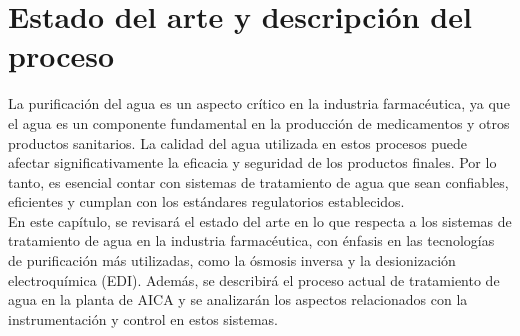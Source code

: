\chapter{Estado del arte y descripción del proceso}
La purificación del agua es un aspecto crítico en la industria farmacéutica, ya que el agua es un componente fundamental en la producción de medicamentos y otros productos sanitarios. La calidad del agua utilizada en estos procesos puede afectar significativamente la eficacia y seguridad de los productos finales. Por lo tanto, es esencial contar con sistemas de tratamiento de agua que sean confiables, eficientes y cumplan con los estándares regulatorios establecidos.\\

En este capítulo, se revisará el estado del arte en lo que respecta a los sistemas de tratamiento de agua en la industria farmacéutica, con énfasis en las tecnologías de purificación más utilizadas, como la ósmosis inversa y la desionización electroquímica (EDI). Además, se describirá el proceso actual de tratamiento de agua en la planta de AICA y se analizarán los aspectos relacionados con la instrumentación y control en estos sistemas.



